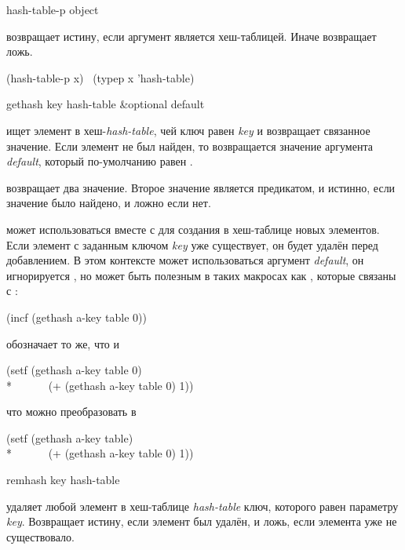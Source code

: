 \begin{defun}[Функция]
hash-table-p object

 возвращает истину, если аргумент является хеш-таблицей. Иначе
возвращает ложь.
\begin{lisp}
(hash-table-p x) \EQ\ (typep x 'hash-table)
\end{lisp}
\end{defun}

\begin{defun}[Функция]
gethash key hash-table &optional default

 ищет элемент в хеш-\emph{hash-table}, чей ключ равен \emph{key} и
возвращает связанное значение. Если элемент не был найден, то возвращается
значение аргумента \emph{default}, который по-умолчанию равен {\false}.

 возвращает два значение. Второе значение является предикатом, и
истинно, если значение было найдено, и ложно если нет.

 может использоваться вместе с  для создания в
хеш-таблице новых элементов. Если элемент с заданным ключом \emph{key} уже
существует, он будет удалён перед добавлением. В этом контексте может
использоваться аргумент \emph{default}, он игнорируется , но может
быть полезным в таких макросах как , которые связаны с :
\begin{lisp}
(incf (gethash a-key table 0))
\end{lisp}
обозначает то же, что и 
\begin{lisp}
(setf (gethash a-key table 0) \\*
~~~~~~(+ (gethash a-key table 0) 1))
\end{lisp}
что можно преобразовать в
\begin{lisp}
(setf (gethash a-key table) \\*
~~~~~~(+ (gethash a-key table 0) 1))
\end{lisp}
\end{defun}

\begin{defun}[Функция]
remhash key hash-table

 удаляет любой элемент в хеш-таблице \emph{hash-table} ключ,
которого равен параметру \emph{key}. Возвращает истину, если элемент был
удалён, и ложь, если элемента уже не существовало.
\end{defun}

